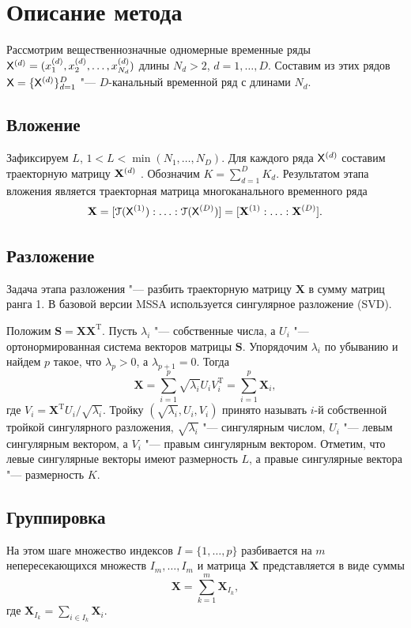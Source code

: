 \documentclass[specialist,
substylefile = spbu_report.rtx,
subf,href,colorlinks=true, 12pt]{disser}
\newcommand{\traj}{\mathbf{X}}
\newcommand{\transponse}{^\mathrm{T}}
\theoremstyle{definition}
\newtheorem{definition}{Определение}
\begin{document}
	\section{Описание метода}
	Рассмотрим вещественнозначные одномерные временные ряды $\mathsf{X}^{(d)}=(x_1^{(d)}, x_2^{(d)},\ldots, x_{N_d}^{(d)})$ длины $N_d>2$, $d=1,\ldots,D$. Составим из этих рядов $\mathsf{X}=\{\mathsf{X}^{(d)}\}_{d=1}^D$ "--- $D$-канальный временной ряд с длинами $N_d$.
	\subsection{Вложение}\label{sect:embedding}
	Зафиксируем $L$, $1<L<\min(N_1,\ldots,N_D)$. Для каждого ряда $\mathsf{X}^{(d)}$ составим траекторную матрицу $\mathbf{X}^{(d)}$ . Обозначим $K=\sum_{d=1}^D K_d$. Результатом этапа вложения является траекторная матрица многоканального временного ряда
	\begin{equation}\label{eq:traj}
		\bfX=[\cT(\tX^{(1)}):\ldots:\cT(\tX^{(D)})]=[\traj^{(1)}:\ldots:\traj^{(D)}].
	\end{equation}
	\subsection{Разложение}
	Задача этапа разложения "--- разбить траекторную матрицу $\traj$ в сумму матриц ранга 1. В базовой версии MSSA используется сингулярное разложение (SVD).
	
	Положим $\mathbf{S}=\traj\traj\transponse$. Пусть $\lambda_i$ "--- собственные числа, а $U_i$ "--- ортонормированная система векторов матрицы $\mathbf{S}$. Упорядочим $\lambda_i$ по убыванию и найдем $p$ такое, что $\lambda_p>0$, а $\lambda_{p+1}=0$. Тогда
	\[
	\traj=\sum_{i=1}^p\sqrt{\lambda_i}U_iV_i\transponse=\sum_{i=1}^p\traj_i,
	\] 
	где $V_i=\traj\transponse U_i/\sqrt{\lambda_i}$. Тройку $(\sqrt{\lambda_i}, U_i, V_i)$ принято называть $i$-й собственной тройкой сингулярного разложения, $\sqrt{\lambda_i}$ "--- сингулярным числом, $U_i$ "--- левым сингулярным вектором, а $V_i$ "--- правым сингулярным вектором. Отметим, что левые сингулярные векторы имеют размерность $L$, а правые сингулярные вектора "--- размерность $K$. 
	\subsection{Группировка}\label{sect:grouping}
	На этом шаге множество индексов $I=\{1,\ldots,p\}$ разбивается на $m$ непересекающихся множеств $I_m,\ldots,I_m$ и матрица $\traj$ представляется в виде суммы
	\[
	\traj = \sum_{k=1}^m \traj_{I_k},
	\]
	где $\traj_{I_k}=\sum_{i\in I_k}\traj_i$.
\end{document}
